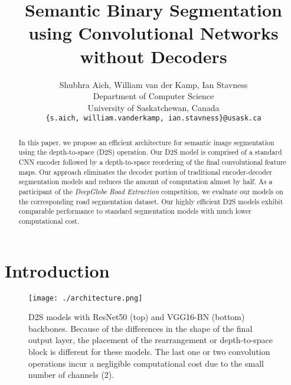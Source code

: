 \documentclass[10pt,twocolumn,letterpaper]{article}
\begin{document}
\title{Semantic Binary Segmentation using Convolutional Networks without Decoders}

\author{Shubhra Aich, William van der Kamp, Ian Stavness\\
Department of Computer Science\\University of Saskatchewan, Canada\\
{\tt\small \{s.aich, william.vanderkamp, ian.stavness\}@usask.ca}
}

\maketitle

\begin{abstract}

In this paper, we propose an efficient architecture for semantic image segmentation using the depth-to-space (D2S) operation. Our D2S model is comprised of a standard CNN encoder followed by a depth-to-space reordering of the final convolutional feature maps. Our approach eliminates the decoder portion of traditional encoder-decoder segmentation models and reduces the amount of computation almost by half. As a participant of the \textit{DeepGlobe Road Extraction} competition, we evaluate our models on the corresponding road segmentation dataset. Our highly efficient D2S models exhibit comparable performance to standard segmentation models with much lower computational cost.

\end{abstract}

\section{Introduction}

\begin{figure*}[t]
\centering
	\texttt{[image: ./architecture.png]}
    \caption{D2S models with ResNet50 (top) and VGG16-BN (bottom) backbones. Because of the differences in the shape of the final output layer, the placement of the rearrangement or depth-to-space block is different for these models. The last one or two convolution operations incur a negligible computational cost due to the small number of channels (2).}
    \label{fig:architecture}
\end{figure*}
\end{document}
